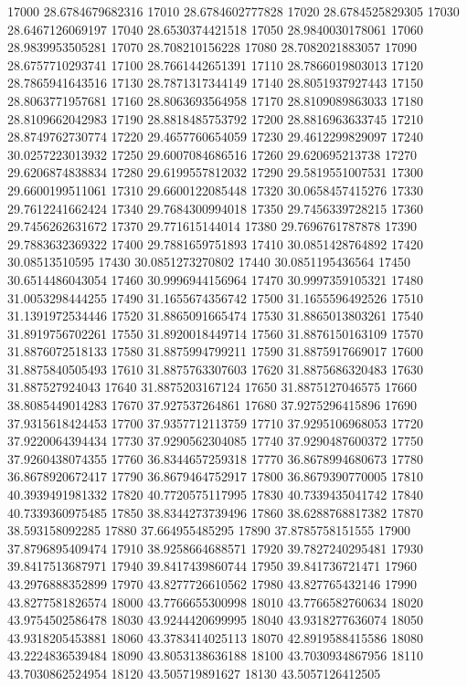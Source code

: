 {17000 28.6784679682316
17010 28.6784602777828
17020 28.6784525829305
17030 28.6467126069197
17040 28.6530374421518
17050 28.9840030178061
17060 28.9839953505281
17070 28.708210156228
17080 28.7082021883057
17090 28.6757710293741
17100 28.7661442651391
17110 28.7866019803013
17120 28.7865941643516
17130 28.7871317344149
17140 28.8051937927443
17150 28.8063771957681
17160 28.8063693564958
17170 28.8109089863033
17180 28.8109662042983
17190 28.8818485753792
17200 28.8816963633745
17210 28.8749762730774
17220 29.4657760654059
17230 29.4612299829097
17240 30.0257223013932
17250 29.6007084686516
17260 29.620695213738
17270 29.6206874838834
17280 29.6199557812032
17290 29.5819551007531
17300 29.6600199511061
17310 29.6600122085448
17320 30.0658457415276
17330 29.7612241662424
17340 29.7684300994018
17350 29.7456339728215
17360 29.7456262631672
17370 29.771615144014
17380 29.7696761787878
17390 29.7883632369322
17400 29.7881659751893
17410 30.0851428764892
17420 30.08513510595
17430 30.0851273270802
17440 30.0851195436564
17450 30.6514486043054
17460 30.9996944156964
17470 30.9997359105321
17480 31.0053298444255
17490 31.1655674356742
17500 31.1655596492526
17510 31.1391972534446
17520 31.8865091665474
17530 31.8865013803261
17540 31.8919756702261
17550 31.8920018449714
17560 31.8876150163109
17570 31.8876072518133
17580 31.8875994799211
17590 31.8875917669017
17600 31.8875840505493
17610 31.8875763307603
17620 31.8875686320483
17630 31.887527924043
17640 31.8875203167124
17650 31.8875127046575
17660 38.8085449014283
17670 37.927537264861
17680 37.9275296415896
17690 37.9315618424453
17700 37.9357712113759
17710 37.9295106968053
17720 37.9220064394434
17730 37.9290562304085
17740 37.9290487600372
17750 37.9260438074355
17760 36.8344657259318
17770 36.8678994680673
17780 36.8678920672417
17790 36.8679464752917
17800 36.8679390770005
17810 40.3939491981332
17820 40.7720575117995
17830 40.7339435041742
17840 40.7339360975485
17850 38.8344273739496
17860 38.6288768817382
17870 38.593158092285
17880 37.664955485295
17890 37.8785758151555
17900 37.8796895409474
17910 38.9258664688571
17920 39.7827240295481
17930 39.8417513687971
17940 39.8417439860744
17950 39.841736721471
17960 43.2976888352899
17970 43.8277726610562
17980 43.827765432146
17990 43.8277581826574
18000 43.7766655300998
18010 43.7766582760634
18020 43.9754502586478
18030 43.9244420699995
18040 43.9318277636074
18050 43.9318205453881
18060 43.3783414025113
18070 42.8919588415586
18080 43.2224836539484
18090 43.8053138636188
18100 43.7030934867956
18110 43.7030862524954
18120 43.505719891627
18130 43.5057126412505
}
